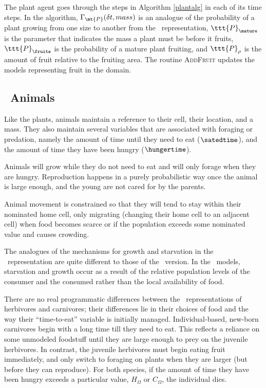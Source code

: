 
The plant agent goes through the steps in Algorithm {\ref{plantalg}} in each
of its time steps. In the algorithm, $\Gamma_{\mt{P}}(\delta t, mass)$ is an
analogue of the probability of a plant growing from one size to another from
the \SD\ rep\-re\-sen\-ta\-tion, $\ttt{P}_{\mature}$ is the parameter that indicates
the mass a plant must be before it fruits, $\ttt{P}_{\fruits}$ is the
probability of a mature plant fruiting, and $\ttt{P}_\rho$ is the amount of
fruit relative to the fruiting area. The routine \textsc{AddFruit} updates the
models representing fruit in the domain.

\subsection{\IB\ Animals}

Like the plants, animals maintain a reference to their cell, their
location, and a mass. They also maintain several variables that are
associated with foraging or predation, namely the amount of time until
they need to eat ($\satedtime$), and the amount of time they have been
hungry ($\hungertime$).

Animals will grow while they do not need to eat and will only forage
when they are hungry.  Reproduction happens in a purely probabilistic
way once the animal is large enough, and the young are not cared for
by the parents.

Animal movement is constrained so that they will tend to stay within
their nominated home cell, only migrating (changing their home cell to
an adjacent cell) when food becomes scarce or if the population
exceeds some nominated value and causes crowding.

The analogues of the mechanisms for growth and starvation in the
\SD\ rep\-re\-sen\-ta\-tion are quite different to those of the \IB\ version.
In the \SD\ models, starvation and growth occur as a result of the
relative population levels of the consumer and the consumed rather
than the local availability of food.

There are no real programmatic differences between the
\IB\ rep\-re\-sen\-ta\-tions of herbivores and carnivores; their differences
lie in their choices of food and the way their ``time-to-eat''
variable is initially managed. In\-di\-vidu\-al-based, new-born carnivores
begin with a long time till they need to eat. This reflects a reliance
on some unmodeled foodstuff until they are large enough to prey on
the juvenile herbivores.  In contrast, the juvenile herbivores must
begin eating fruit immediately, and only switch to foraging on plants
when they are larger (but before they can reproduce). For both
species, if the amount of time they have been hungry exceeds a
particular value, $H_\Omega$ or $C_\Omega$, the in\-di\-vidu\-al dies.

